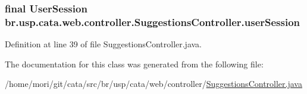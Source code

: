 \hypertarget{classbr_1_1usp_1_1cata_1_1web_1_1controller_1_1_suggestions_controller_a80cc6dcb0ec54ab53e01bcb2a71e4844}{
\subsubsection[{user\+Session}]{\setlength{\rightskip}{0pt plus 5cm}final {\bf User\+Session} br.\+usp.\+cata.\+web.\+controller.\+Suggestions\+Controller.\+user\+Session\hspace{0.3cm}{\ttfamily [private]}}}\label{classbr_1_1usp_1_1cata_1_1web_1_1controller_1_1_suggestions_controller_a80cc6dcb0ec54ab53e01bcb2a71e4844}


Definition at line 39 of file Suggestions\+Controller.\+java.



The documentation for this class was generated from the following file\+:\begin{DoxyCompactItemize}
\item 
/home/mori/git/cata/src/br/usp/cata/web/controller/\hyperlink{_suggestions_controller_8java}{Suggestions\+Controller.\+java}\end{DoxyCompactItemize}
